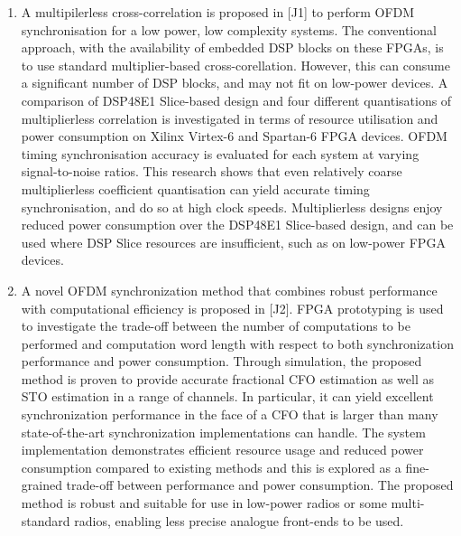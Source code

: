 \begin{enumerate}
\item A multipilerless cross-correlation is proposed in [J1] to perform OFDM synchronisation for a low power, low complexity systems.
The conventional approach, with the availability of embedded DSP blocks on these FPGAs, is to use standard multiplier-based cross-corellation. However, this can consume a significant number of DSP blocks, and may not fit on low-power devices.
A comparison of DSP48E1 Slice-based design and four different quantisations of multiplierless correlation is investigated in terms of resource utilisation and power consumption on Xilinx Virtex-6 and Spartan-6 FPGA devices.
OFDM timing synchronisation accuracy is evaluated for each system at varying signal-to-noise ratios. This research shows that even relatively coarse multiplierless coefficient quantisation can yield accurate timing synchronisation, and do so at high clock speeds.
Multiplierless designs enjoy reduced power consumption over the DSP48E1 Slice-based design, and can be used where DSP Slice resources are insufficient, such as on low-power FPGA devices.

\item A novel OFDM synchronization method that combines robust performance with computational efficiency is proposed in [J2].
FPGA prototyping is used to investigate the trade-off between the number of computations to be performed and computation word length with respect to both synchronization performance and power consumption.
Through simulation, the proposed method is proven to provide accurate fractional CFO estimation as well as STO estimation in a range of channels.
In particular, it can yield excellent synchronization performance in the face of a CFO that is larger than many state-of-the-art synchronization implementations can handle.
The system implementation demonstrates efficient resource usage and reduced power consumption compared to existing methods and this is explored as a fine-grained trade-off between performance and power consumption.
The proposed method is robust and suitable for use in low-power radios or some multi-standard radios, enabling less precise analogue front-ends to be used.


\end{enumerate}
